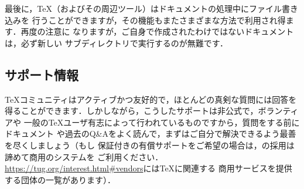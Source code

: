\documentclass[uplatex,dvipdfmx,tombow]{jsarticle}
\begin{document}
最後に，\TeX （およびその周辺ツール）はドキュメントの処理中にファイル書き込みを
行うことができますが，その機能もまたさまざまな方法で利用され得ます．再度の注意に
なりますが，ご自身で作成されたわけではないドキュメントは，必ず新しい
サブディレクトリで実行するのが無難です．

\subsection{サポート情報}
\label{sec:help}

\TeX コミュニティはアクティブかつ友好的で，ほとんどの真剣な質問には回答を
得ることができます．しかしながら，こうしたサポートは非公式で，ボランティアや
一般の\TeX ユーザ有志によって行われているものですから，質問をする前にドキュメント
や過去のQ\&Aをよく読んで，まずはご自分で解決できるよう最善を尽くしましょう（もし
保証付きの有償サポートをご希望の場合は，\TL の採用は諦めて商用のシステムを
ご利用ください．\url{https://tug.org/interest.html#vendors}には\TeX に関連する
商用サービスを提供する団体の一覧があります）．
\end{document}
